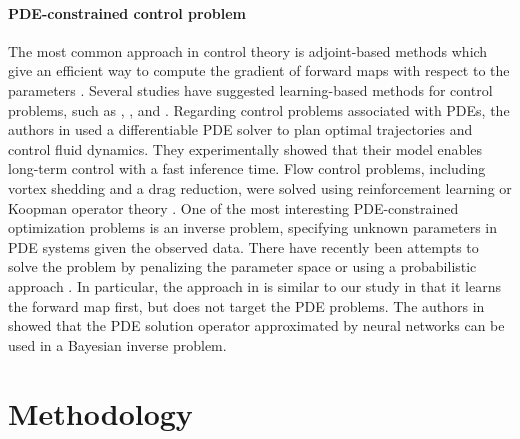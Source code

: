 \documentclass[letterpaper]{article}
\begin{document}
\paragraph{PDE-constrained control problem}
The most common approach in control theory is adjoint-based methods which give an efficient way to compute the gradient of forward maps with respect to the parameters \citep{borrvall2003topology,christofides2002nonlinear,lions1971optimal, mcnamara2004fluid, pironneau1974optimum,troltzsch2010optimal}. Several studies have suggested learning-based methods for control problems, such as \cite{de2018end}, \cite{hafner2019learning}, and \cite{NIPS2015_a1afc58c}. Regarding control problems associated with PDEs, the authors in \cite{holl2020learning} used a differentiable PDE solver to plan optimal trajectories and control fluid dynamics. They experimentally showed that their model enables long-term control with a fast inference time. Flow control problems, including vortex shedding and a drag reduction, were solved using reinforcement learning \cite{rabault2019artificial} or Koopman operator theory \cite{NEURIPS2018_2b0aa0d9}. One of the most interesting PDE-constrained optimization problems is an inverse problem, specifying unknown parameters in PDE systems given the observed data. There have recently been attempts to solve the problem by penalizing the parameter space or using a probabilistic approach \citep{jo2020deep, NEURIPS2019_28f0b864, ma2019probabilistic, pilozzi2018machine, ren2020benchmarking}. In particular, the approach in \cite{ren2020benchmarking} is similar to our study in that it learns the forward map first, but does not target the PDE problems. The authors in \cite{li2020fourier} showed that the PDE solution operator approximated by neural networks can be used in a Bayesian inverse problem. 




\section*{Methodology}\label{method}
\end{document}
